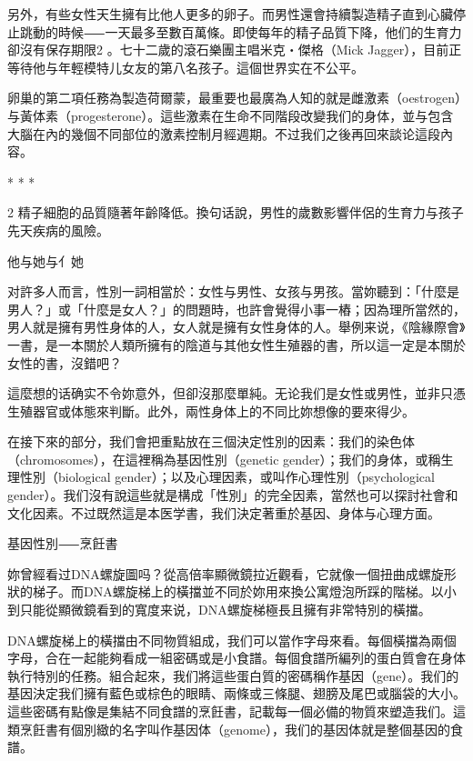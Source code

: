 \documentclass[12pt,UTF8]{ctexbook}
\begin{document}
另外，有些女性天生擁有比他人更多的卵子。而男性還會持續製造精子直到心臟停止跳動的時候⸺一天最多至數百萬條。即使每年的精子品質下降，他们的生育力卻沒有保存期限2 。七十二歲的滾石樂團主唱米克‧傑格（Mick Jagger），目前正等待他与年輕模特儿女友的第八名孩子。這個世界实在不公平。

卵巢的第二項任務為製造荷爾蒙，最重要也最廣為人知的就是雌激素（oestrogen）与黃体素（progesterone）。這些激素在生命不同階段改變我们的身体，並与包含大腦在內的幾個不同部位的激素控制月經週期。不过我们之後再回來談论這段內容。





* * *



2	精子細胞的品質隨著年齡降低。換句话說，男性的歲數影響伴侶的生育力与孩子先天疾病的風險。





他与她与亻她




对許多人而言，性別一詞相當於：女性与男性、女孩与男孩。當妳聽到：「什麼是男人？」或「什麼是女人？」的問題時，也許會覺得小事一樁；因為理所當然的，男人就是擁有男性身体的人，女人就是擁有女性身体的人。舉例来说，《陰緣際會》一書，是一本關於人類所擁有的陰道与其他女性生殖器的書，所以這一定是本關於女性的書，沒錯吧？

這麼想的话确实不令妳意外，但卻沒那麼單純。无论我们是女性或男性，並非只憑生殖器官或体態來判斷。此外，兩性身体上的不同比妳想像的要來得少。

在接下來的部分，我们會把重點放在三個決定性別的因素：我们的染色体（chromosomes），在這裡稱為基因性別（genetic gender）；我们的身体，或稱生理性別（biological gender）；以及心理因素，或叫作心理性別（psychological gender）。我们沒有說這些就是構成「性別」的完全因素，當然也可以探討社會和文化因素。不过既然這是本医学書，我们決定著重於基因、身体与心理方面。





基因性別⸺烹飪書




妳曾經看过DNA螺旋圖吗？從高倍率顯微鏡拉近觀看，它就像一個扭曲成螺旋形狀的梯子。而DNA螺旋梯上的橫擋並不同於妳用來換公寓燈泡所踩的階梯。以小到只能從顯微鏡看到的寬度来说，DNA螺旋梯極長且擁有非常特別的橫擋。





DNA螺旋梯上的橫擋由不同物質組成，我们可以當作字母來看。每個橫擋為兩個字母，合在一起能夠看成一組密碼或是小食譜。每個食譜所編列的蛋白質會在身体執行特別的任務。組合起來，我们將這些蛋白質的密碼稱作基因（gene）。我们的基因決定我们擁有藍色或棕色的眼睛、兩條或三條腿、翅膀及尾巴或腦袋的大小。這些密碼有點像是集結不同食譜的烹飪書，記載每一個必備的物質來塑造我们。這類烹飪書有個別緻的名字叫作基因体（genome），我们的基因体就是整個基因的食譜。
\end{document}
